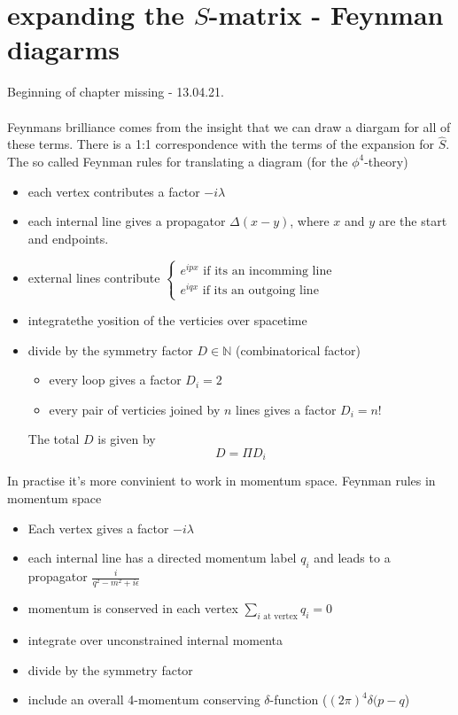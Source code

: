 \documentclass{report}
\begin{document}
\chapter{expanding the $S$-matrix - Feynman diagarms}
Beginning of chapter missing - 13.04.21.\\
\\
Feynmans brilliance comes from the insight that we can draw a diargam for all of these terms. There is a 1:1 correspondence with the terms of the expansion for $\hat{S}$. The so called Feynman rules for translating a diagram (for the $\phi^4$-theory)
\begin{itemize}
  \item each vertex contributes a factor $-i\lambda$
  \item each internal line gives a propagator $\Delta(x-y)$, where $x$ and $y$ are the start and endpoints.
  \item external lines contribute $\begin{cases}
      e^{ipx} \text{ if its an incomming line}\\
      e^{iqx} \text{ if its an outgoing line}
  \end{cases}$ 
\item integratethe yosition of the verticies over spacetime
\item divide by the symmetry factor $D \in \mathbb{N}$ (combinatorical factor)
  \begin{itemize}
    \item every loop gives a factor $D_i = 2$
    \item every pair of verticies joined by  $n$ lines gives a  factor $D_i = n!$
  \end{itemize}
  The total $D$ is given by \[
  D = \Pi D_i
  \] 
\end{itemize}
In practise it's more convinient to work in momentum space. Feynman rules in momentum space
\begin{itemize}
  \item Each vertex gives a factor $-i \lambda$
  \item each internal line has a directed momentum label $q_i$ and leads to a propagator $\frac{i}{q^2-m^2+i\epsilon}$ 
  \item momentum is conserved in each vertex $\sum_{i \text{ at vertex}} q_i = 0$ 
  \item integrate over unconstrained internal momenta
  \item divide by the symmetry factor
  \item include an overall 4-momentum conserving $\delta$-function ($\left( 2 \pi \right)^4 \delta(p-q$)
\end{itemize}
\end{document}
